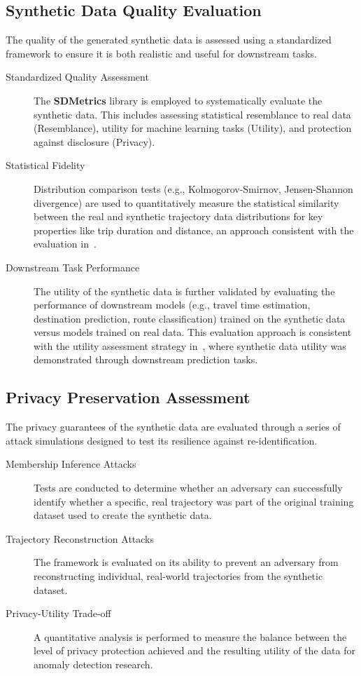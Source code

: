\documentclass[runningheads]{llncs}
\begin{document}
\subsection{Synthetic Data Quality Evaluation}
\label{sec:synthetic-eval}

The quality of the generated synthetic data is assessed using a standardized framework to ensure it is both realistic and useful for downstream tasks.

\begin{description}
    \item[Standardized Quality Assessment] The \textbf{SDMetrics} library is employed to systematically evaluate the synthetic data. This includes assessing statistical resemblance to real data (Resemblance), utility for machine learning tasks (Utility), and protection against disclosure (Privacy).
    \item[Statistical Fidelity] Distribution comparison tests (e.g., Kolmogorov-Smirnov, Jensen-Shannon divergence) are used to quantitatively measure the statistical similarity between the real and synthetic trajectory data distributions for key properties like trip duration and distance, an approach consistent with the evaluation in~\cite{zhuDiffTrajGeneratingGPS2023}.
    \item[Downstream Task Performance] The utility of the synthetic data is further validated by evaluating the performance of downstream models (e.g., travel time estimation, destination prediction, route classification) trained on the synthetic data versus models trained on real data. This evaluation approach is consistent with the utility assessment strategy in~\cite{zhuDiffTrajGeneratingGPS2023}, where synthetic data utility was demonstrated through downstream prediction tasks.
\end{description}

\subsection{Privacy Preservation Assessment}
\label{sec:privacy-eval}

The privacy guarantees of the synthetic data are evaluated through a series of attack simulations designed to test its resilience against re-identification.

\begin{description}
    \item[Membership Inference Attacks] Tests are conducted to determine whether an adversary can successfully identify whether a specific, real trajectory was part of the original training dataset used to create the synthetic data.
    \item[Trajectory Reconstruction Attacks] The framework is evaluated on its ability to prevent an adversary from reconstructing individual, real-world trajectories from the synthetic dataset.
    \item[Privacy-Utility Trade-off] A quantitative analysis is performed to measure the balance between the level of privacy protection achieved and the resulting utility of the data for anomaly detection research.
\end{description}
\end{document}
